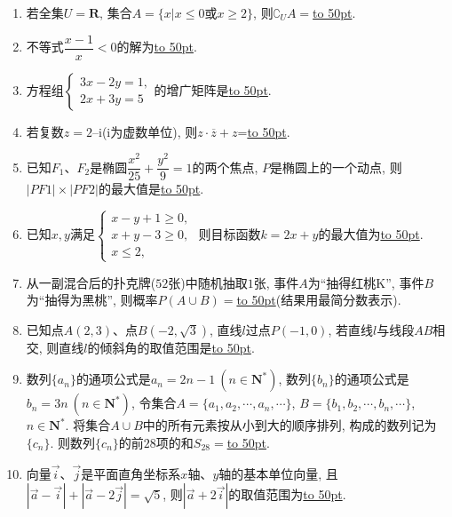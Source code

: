 \documentclass[10pt,a4paper]{article}
\newcommand{\blank}[1]{\underline{\hbox to #1pt{}}}
\begin{document}
\begin{enumerate}[1.]
\item 若全集$U=\mathbf{R}$, 集合$A=\{x|x\le 0\text{或} x\ge 2\}$, 则$\complement_U A=$\blank{50}.
\item 不等式$\dfrac{x-1}x<0$的解为\blank{50}.
\item 方程组$\begin{cases} 3x-2y=1, \\ 2x+3y=5 \end{cases}$的增广矩阵是\blank{50}.
\item 若复数$z=2–\mathrm{i}$($\mathrm{i}$为虚数单位), 则$z\cdot \overline z+z$=\blank{50}.
\item 已知$F_1$、$F_2$是椭圆$\dfrac{x^2}{25}+\dfrac{y^2}9=1$的两个焦点, $P$是椭圆上的一个动点, 则$|PF1|\times |PF2|$的最大值是\blank{50}.
\item 已知$x, y$满足$\begin{cases}x-y+1 \ge 0, \\ x+y-3 \ge 0, \\  x\le 2, \end{cases}$ 则目标函数$k=2x+y$的最大值为\blank{50}.  
\item 从一副混合后的扑克牌($52$张)中随机抽取$1$张, 事件$A$为``抽得红桃K'', 事件$B$为``抽得为黑桃'', 则概率$P(A\cup B)=$\blank{50}(结果用最简分数表示).  
\item 已知点$A(2,3)$、点$B(-2,\sqrt3)$, 直线$l$过点$P(-1,0)$, 若直线$l$与线段$AB$相交, 则直线$l$的倾斜角的取值范围是\blank{50}.  
\item 数列$\{a_n\}$的通项公式是$a_n=2n-1\ (n\in \mathbf{N}^*)$, 数列$\{b_n\}$的通项公式是$b_n=3n \ (n\in \mathbf{N}^*)$, 令集合$A=\{a_1,a_2,\cdots,a_n,\cdots\}$, $B=\{b_1,b_2,\cdots,b_n,\cdots\}$, $n\in \mathbf{N}^*$. 将集合$A\cup B$中的所有元素按从小到大的顺序排列, 构成的数列记为$\{c_n\}$. 则数列$\{c_n\}$的前$28$项的和$S_{28}=$\blank{50}.
\item 向量$\overrightarrow{i}$、$\overrightarrow{j}$是平面直角坐标系$x$轴、$y$轴的基本单位向量, 且$|\overrightarrow a-\overrightarrow i|+|\overrightarrow a-2\overrightarrow j|=\sqrt5$, 则$|\overrightarrow a+2 \overrightarrow i|$的取值范围为\blank{50}.  



\end{enumerate}
\end{document}
